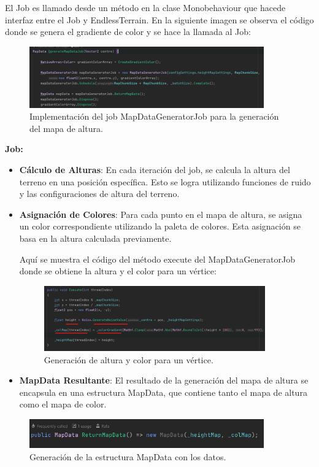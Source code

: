 El Job es llamado desde un método en la clase Monobehaviour que hacede interfaz entre el Job y EndlessTerrain. En la siguiente imagen se observa el código donde se genera el gradiente de color y se hace la llamada al Job:
\begin{figure}[h]
    \centering
    \includegraphics[width=0.9\textwidth]{img/codes/MapGenerator-GenerateMapData.png}
    \caption{Implementación del job MapDataGeneratorJob para la generación del mapa de altura.}
    \end{figure}

\textbf{Job:}

\begin{itemize}
\item \textbf{Cálculo de Alturas}: En cada iteración del job, se calcula la altura del terreno en una posición específica. Esto se logra utilizando funciones de ruido y las configuraciones de altura del terreno.
\item \textbf{Asignación de Colores}: Para cada punto en el mapa de altura, se asigna un color correspondiente utilizando la paleta de colores. Esta asignación se basa en la altura calculada previamente.

Aquí se muestra el código del método execute del MapDataGeneratorJob donde se obtiene la altura y el color para un vértice:
\begin{figure}[h]
    \centering
    \includegraphics[width=0.9\textwidth]{img/codes/GenracionAlturaYColores.png}
    \caption{Generación de altura y color para un vértice.}
\end{figure}

\item \textbf{MapData Resultante}: El resultado de la generación del mapa de altura se encapsula en una estructura MapData, que contiene tanto el mapa de altura como el mapa de color.
\end{itemize}
\begin{figure}[h]
    \centering
    \includegraphics[width=0.9\textwidth]{img/codes/MapDataReturn.png}
    \caption{Generación de la estructura MapData con los datos.}
\end{figure}

